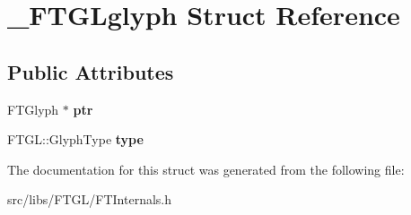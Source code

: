 \hypertarget{struct___f_t_g_lglyph}{
\section{\_\-FTGLglyph Struct Reference}
\label{struct___f_t_g_lglyph}
}
\subsection*{Public Attributes}
\begin{DoxyCompactItemize}
\item 
\hypertarget{struct___f_t_g_lglyph_a6bd6880c871ebdc4f78f15f698e8421b}{
FTGlyph $\ast$ {\bfseries ptr}}
\label{struct___f_t_g_lglyph_a6bd6880c871ebdc4f78f15f698e8421b}

\item 
\hypertarget{struct___f_t_g_lglyph_aa5d5991a60bfba8ee2a8f850553675b8}{
FTGL::GlyphType {\bfseries type}}
\label{struct___f_t_g_lglyph_aa5d5991a60bfba8ee2a8f850553675b8}

\end{DoxyCompactItemize}


The documentation for this struct was generated from the following file:\begin{DoxyCompactItemize}
\item 
src/libs/FTGL/FTInternals.h\end{DoxyCompactItemize}
